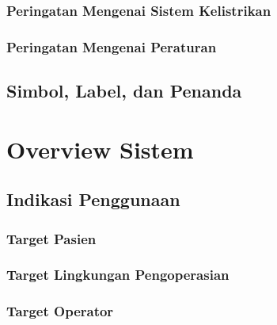 \documentclass[11pt,a4paper,twoside,draft,onecolumn]{book}
\begin{document}
			\subsubsection{Peringatan Mengenai Sistem Kelistrikan}
			\subsubsection{Peringatan Mengenai Peraturan}
		\subsection{Simbol, Label, dan Penanda}
	\newpage
	
	\section{Overview Sistem}
		\subsection{Indikasi Penggunaan}
			\subsubsection{Target Pasien}
			\subsubsection{Target Lingkungan Pengoperasian}
			\subsubsection{Target Operator}
	
	
\end{document}
